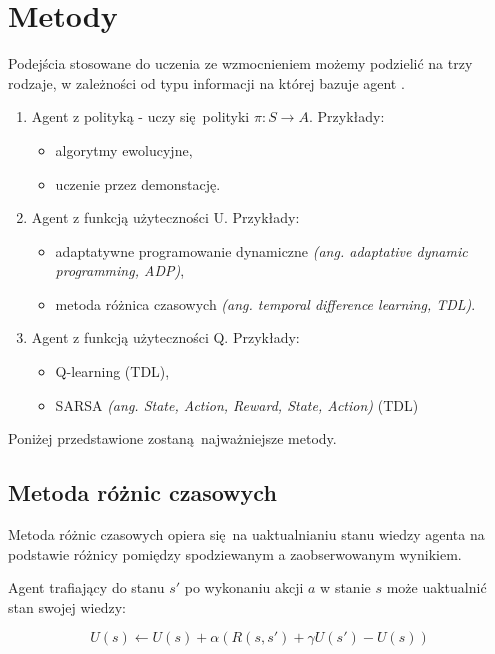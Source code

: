 \section{Metody}\label{methods}

Podejścia stosowane do uczenia ze wzmocnieniem możemy podzielić na trzy rodzaje, w zależności od typu informacji na której bazuje agent \cite{wjaskowski2016}.

\begin{enumerate}
\item Agent z polityką - uczy się polityki  $\pi: S \rightarrow A$. Przykłady:
\begin{itemize}
\item algorytmy ewolucyjne,
\item uczenie przez demonstację.
\end{itemize}
\item Agent z funkcją użyteczności U. Przykłady:
\begin{itemize}
\item adaptatywne programowanie dynamiczne \textit{(ang. adaptative dynamic programming, ADP)},
\item metoda różnica czasowych \textit{(ang. temporal difference learning, TDL)}.
\end{itemize}
\item Agent z funkcją użyteczności Q. Przykłady:
\begin{itemize}
\item Q-learning (TDL),
\item SARSA \textit{(ang. State, Action, Reward, State, Action)} (TDL)
\end{itemize}
\end{enumerate}

Poniżej przedstawione zostaną najważniejsze metody.

\subsection{Metoda różnic czasowych}\label{tdl}

Metoda różnic czasowych \cite{Sutton:1988:LPM:637912.637937} opiera się na uaktualnianiu stanu wiedzy agenta na podstawie różnicy pomiędzy spodziewanym a zaobserwowanym wynikiem.

Agent trafiający do stanu $s'$ po wykonaniu akcji $a$ w stanie $s$ może uaktualnić stan swojej wiedzy:

$$U(s) \leftarrow U(s) + \alpha (R(s,s') + \gamma U(s') - U (s))$$

